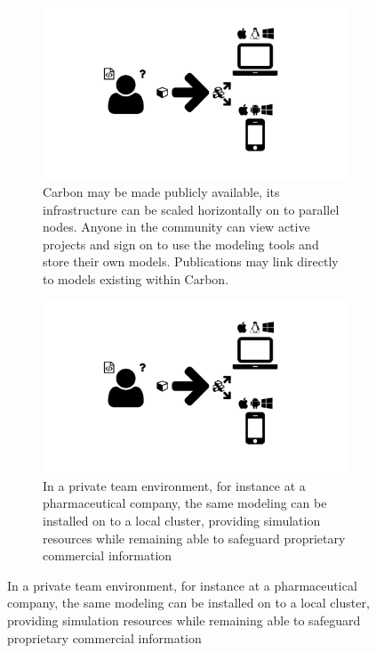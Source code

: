 \begin{figure}
  \centering
  \begin{subfigure}[b]{0.5\textwidth}
    \includegraphics[width=\textwidth, page=30, trim=0cm 0cm 14cm 7cm, clip=true]{images/Figures.pdf}
    \caption{Carbon may be made publicly available, its infrastructure can be scaled horizontally on to parallel nodes.
      Anyone in the community can view active projects and sign on to use the modeling tools and store their own models.
      Publications may link directly to models existing within Carbon.}
    \label{Figure:redox-table-view}
  \end{subfigure}
  \begin{subfigure}[b]{0.45\textwidth}
    \includegraphics[width=\textwidth, page=31, trim=0cm 0cm 17cm 9cm, clip=true]{images/Figures.pdf}
    \caption{In a private team environment, for instance at a pharmaceutical company, the same modeling can be installed on to a local cluster, providing simulation resources while remaining able to safeguard proprietary commercial information}
    \label{Figure:redox-table-pinned}
  \end{subfigure}

\end{figure}
